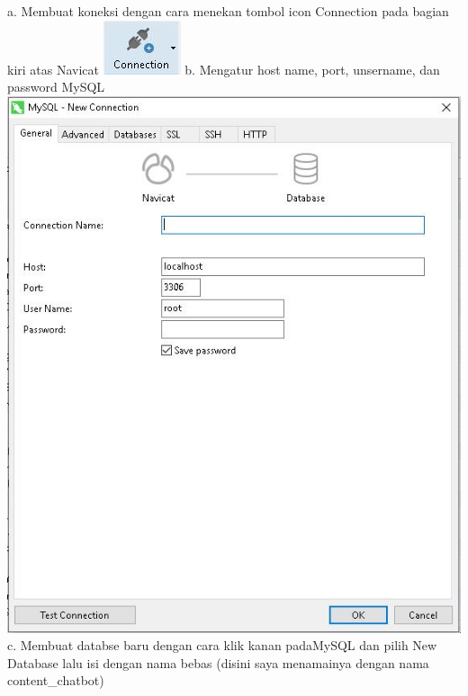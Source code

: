 \documentclass{article}
\begin{document}
\begin{enumerate}
        \newline
        a. Membuat koneksi  dengan cara menekan tombol icon Connection pada bagian kiri atas Navicat 
         \newline
        \includegraphics[scale=2]{26.5a.jpg}
        \newline
        b. Mengatur  host name,  port,  unsername, dan password MySQL
          \newline
        \includegraphics[scale=0.5]{26.5b.jpg}
        \newline
        c. Membuat databse baru dengan cara klik kanan padaMySQL dan pilih New Database lalu isi dengan nama bebas (disini saya menamainya dengan nama content_chatbot)
        \newline

\end{enumerate}
\end{document}
